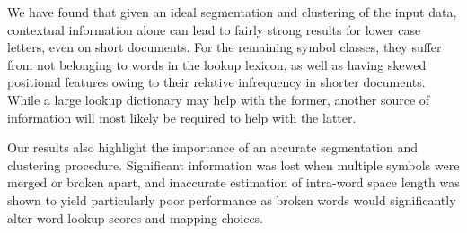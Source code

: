 \documentclass[times, 10pt,twocolumn]{article}
\begin{document}

We have found that given an ideal segmentation and clustering of the input
data, contextual information alone can lead to fairly strong results for lower
case letters, even on short documents.  For the remaining symbol classes, they
suffer from not belonging to words in the lookup lexicon, as well as
having skewed positional features owing to their relative infrequency in shorter
documents.  While a large lookup dictionary may help with the former, another
source of information will most likely be required to help with the latter.

Our results also highlight the importance of an accurate segmentation and
clustering procedure.  Significant information was lost when multiple symbols
were merged or broken apart, and inaccurate estimation of intra-word space
length was shown to yield particularly poor performance as broken words would
significantly alter word lookup scores and mapping choices.




\end{document}
